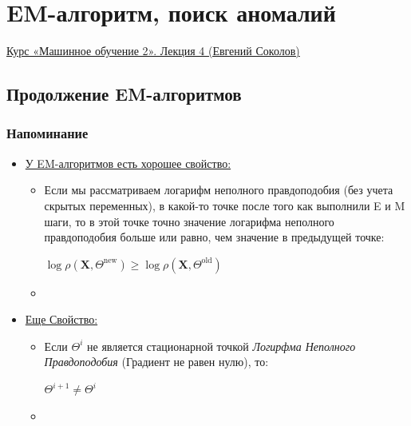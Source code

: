 \begin{itemize}
\begin{itemize}
            \end{itemize}

        \end{itemize}


\newpage
\section{EM-алгоритм, поиск аномалий}

    \href{https://www.youtube.com/watch?v=lGqsFjCM2w0&list=PLEqoHzpnmTfAVdVl2fH_je2_jWCEPAAqv&index=4}{Курс «Машинное обучение 2». Лекция 4 (Евгений Соколов)}

    \subsection{Продолжение EM-алгоритмов}

        \subsubsection{Напоминание}

            \begin{itemize}
                \item \underline{У EM-алгоритмов есть хорошее свойство:}
                \begin{itemize}
                    \item Если мы рассматриваем логарифм неполного правдоподобия (без учета скрытых переменных), в какой-то точке после того как выполнили E и M шаги, то в этой точке точно значение логарифма неполного правдоподобия больше или равно, чем значение в предыдущей точке:
                    \begin{center}
                        \Large
                        $\log \rho(\mathbf{X}, \Theta^{\text{new}}) \geq \log \rho(\mathbf{X}, \Theta^{
                        \text{old}})$
                    \end{center}

                    \item {}
                \end{itemize}

                \item \underline{Еще Свойство:}
                \begin{itemize}
                    \item Если $\Theta^i$ не является стационарной точкой \textit{Логирфма Неполного Правдоподобия} (Градиент не равен нулю), то:
                    \begin{center}
                        \Large
                        $\Theta^{i + 1} \neq \Theta^i$
                    \end{center}

                    \item {}
                \end{itemize}
            \end{itemize}


